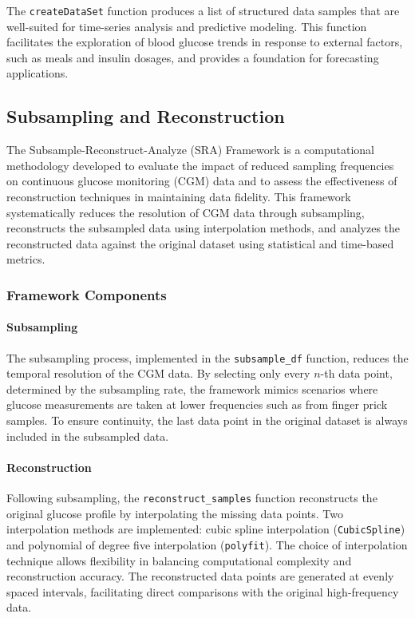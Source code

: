The \texttt{createDataSet} function produces a list of structured data samples that are well-suited for time-series analysis and predictive modeling. This function facilitates the exploration of blood glucose trends in response to external factors, such as meals and insulin dosages, and provides a foundation for forecasting applications.

\subsection{Subsampling and Reconstruction}
The Subsample-Reconstruct-Analyze (SRA) Framework is a computational methodology developed to evaluate the impact of reduced sampling frequencies on continuous glucose monitoring (CGM) data and to assess the effectiveness of reconstruction techniques in maintaining data fidelity. This framework systematically reduces the resolution of CGM data through subsampling, reconstructs the subsampled data using interpolation methods, and analyzes the reconstructed data against the original dataset using statistical and time-based metrics.

\subsubsection{Framework Components}
\paragraph{Subsampling} The subsampling process, implemented in the \texttt{subsample\_df} function, reduces the temporal resolution of the CGM data. By selecting only every \(n\)-th data point, determined by the subsampling rate, the framework mimics scenarios where glucose measurements are taken at lower frequencies such as from finger prick samples. To ensure continuity, the last data point in the original dataset is always included in the subsampled data.

\paragraph{Reconstruction}
Following subsampling, the \texttt{reconstruct\_samples} function reconstructs the original glucose profile by interpolating the missing data points. Two interpolation methods are implemented: cubic spline interpolation (\texttt{CubicSpline}) and polynomial of degree five interpolation (\texttt{polyfit}). The choice of interpolation technique allows flexibility in balancing computational complexity and reconstruction accuracy. The reconstructed data points are generated at evenly spaced intervals, facilitating direct comparisons with the original high-frequency data.

